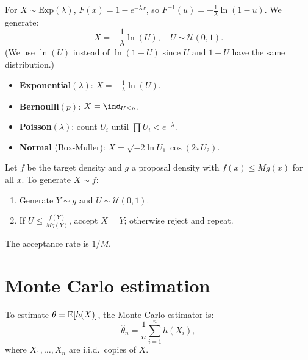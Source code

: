 \begin{example}
For $X \sim \mathrm{Exp}(\lambda)$, $F(x) = 1 - e^{-\lambda x}$, so
$F^{-1}(u) = -\frac{1}{\lambda} \ln(1-u)$. We generate:
\[
  X = -\frac{1}{\lambda} \ln(U), \quad U \sim \mathcal{U}(0,1).
\]
(We use $\ln(U)$ instead of $\ln(1-U)$ since $U$ and $1-U$ have the same
distribution.)
\end{example}

\begin{keyformulas}[title=\textbf{Generating classical distributions}]
\begin{itemize}
  \item \textbf{Exponential}$(\lambda)$:
        $X = -\frac{1}{\lambda} \ln(U)$.
  \item \textbf{Bernoulli}$(p)$: $X = \ind_{U \leq p}$.
  \item \textbf{Poisson}$(\lambda)$: count $U_i$ until
        $\prod U_i < e^{-\lambda}$.
  \item \textbf{Normal} (Box-Muller):
        $X = \sqrt{-2 \ln U_1} \cos(2\pi U_2)$.
\end{itemize}
\end{keyformulas}

\begin{theorem}
Let $f$ be the target density and $g$ a proposal density with
$f(x) \leq M g(x)$ for all $x$. To generate $X \sim f$:
\begin{enumerate}
  \item Generate $Y \sim g$ and $U \sim \mathcal{U}(0,1)$.
  \item If $U \leq \frac{f(Y)}{M g(Y)}$, accept $X = Y$; otherwise reject
        and repeat.
\end{enumerate}
The acceptance rate is $1/M$.
\end{theorem}

\section{Monte Carlo estimation}

\begin{definition}
To estimate $\theta = \mathbb{E}[h(X)]$, the Monte Carlo estimator is:
\[
  \hat{\theta}_n = \frac{1}{n} \sum_{i=1}^n h(X_i),
\]
where $X_1, \ldots, X_n$ are i.i.d.\ copies of $X$.
\end{definition}

